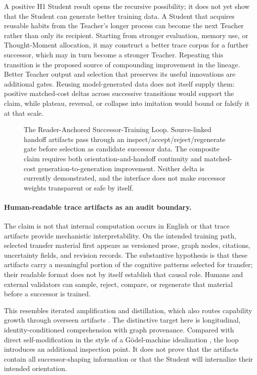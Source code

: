 \documentclass[11pt]{article}
\begin{document}
		A positive H1 Student result opens the recursive possibility; it does not yet
show that the Student can generate better training data. A Student
		that acquires reusable habits from the Teacher's longer process can become
		the next Teacher rather than only its recipient. Starting from stronger
		evaluation, memory use, or Thought-Moment allocation, it may construct a
		better trace corpus for a further successor, which may in turn become a
		stronger Teacher. Repeating this transition is the proposed source of
		compounding improvement in the lineage. Better Teacher output and selection that preserves its useful innovations are
		additional gates. Reusing model-generated data does not itself supply them: positive matched-cost deltas across successive
		transitions would support the claim, while plateau, reversal, or collapse
		into imitation would bound or falsify it at that scale.
	
		\begin{figure}[h]
			\centering
			\resizebox{0.94\textwidth}{!}{}
				\caption{The Reader-Anchored Successor-Training Loop. Source-linked handoff artifacts pass through an inspect/accept/reject/regenerate gate before selection as candidate successor data. The composite claim requires both orientation-and-handoff continuity and matched-cost generation-to-generation improvement. Neither delta is currently demonstrated, and the interface does not make successor weights transparent or safe by itself.}
				\label{fig:self-improvement}
			\end{figure}
			\FloatBarrier

					\paragraph{Human-readable trace artifacts as an audit boundary.} The claim is not that internal computation occurs in English or that trace artifacts provide mechanistic interpretability. On the intended training path, selected transfer material first appears as
versioned prose, graph nodes, citations, uncertainty fields, and revision
records. The substantive hypothesis is that these artifacts carry a meaningful
portion of the cognitive patterns selected for transfer; their readable format
does not by itself establish that causal role. Humans and external validators can sample, reject, compare, or regenerate that material before a successor is trained.

			This resembles iterated amplification and distillation, which also routes capability growth through overseen artifacts \cite{christiano2018amplification}. The distinctive target here is longitudinal, identity-conditioned comprehension with graph provenance. Compared with direct self-modification in the style of a Gödel-machine idealization \cite{schmidhuber2006goedelmachinesselfreferentialuniversal}, the loop introduces an additional inspection point. It does not prove that the artifacts contain all successor-shaping information or that the Student will internalize their intended orientation.
\end{document}
